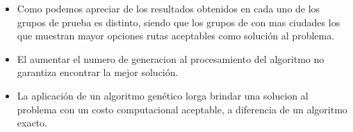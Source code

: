 \documentclass{article}
\begin{document}
  \begin{itemize}
    \item Como podemos apreciar de los resultados obtenidos en cada  uno de los grupos de prueba es distinto, siendo que los grupos de con mas ciudades los que muestran mayor opciones rutas aceptables como solución al problema.
    \item El aumentar el numero de generacion al procesamiento del algoritmo no garantiza encontrar la mejor solución.
    \item La aplicación de un algoritmo genético lorga brindar una solucion al problema con un costo computacional aceptable, a diferencia de un algoritmo exacto.
  \end{itemize}
\end{document}
